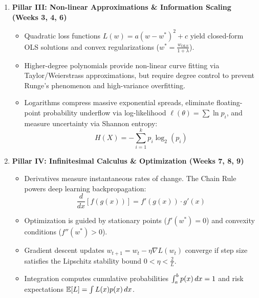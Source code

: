 \begin{enumerate}
    \item \textbf{Pillar III: Non-linear Approximations \& Information Scaling (Weeks 3, 4, 6)}
    \begin{itemize}
        \item Quadratic loss functions $L(w) = a(w - w^*)^2 + c$ yield closed-form OLS solutions and convex regularizations ($w^* = \frac{w_{\text{OLS}}}{1 + \lambda}$).
        \item Higher-degree polynomials provide non-linear curve fitting via Taylor/Weierstrass approximations, but require degree control to prevent Runge's phenomenon and high-variance overfitting.
        \item Logarithms compress massive exponential spreads, eliminate floating-point probability underflow via log-likelihood $\ell(\theta) = \sum \ln p_i$, and measure uncertainty via Shannon entropy:
        \begin{equation}
        H(X) = -\sum_{i=1}^k p_i \log_2(p_i)
        \end{equation}
    \end{itemize}

    \item \textbf{Pillar IV: Infinitesimal Calculus \& Optimization (Weeks 7, 8, 9)}
    \begin{itemize}
        \item Derivatives measure instantaneous rates of change. The Chain Rule powers deep learning backpropagation:
        \begin{equation}
        \frac{d}{dx}[f(g(x))] = f'(g(x)) \cdot g'(x)
        \end{equation}
        \item Optimization is guided by stationary points ($f'(w^*) = 0$) and convexity conditions ($f''(w^*) > 0$).
        \item Gradient descent updates $w_{t+1} = w_t - \eta \nabla L(w_t)$ converge if step size satisfies the Lipschitz stability bound $0 < \eta < \frac{2}{L}$.
        \item Integration computes cumulative probabilities $\int_a^b p(x) \,dx = 1$ and risk expectations $\mathbb{E}[L] = \int L(x) p(x) \,dx$.
    \end{itemize}


\end{enumerate}
